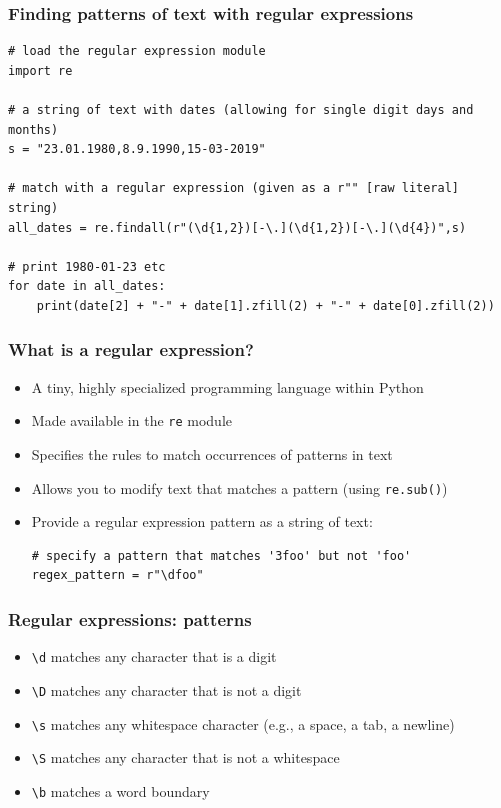 \documentclass[xcolor=table]{beamer}
\begin{document}
\begin{frame}[fragile]
\frametitle{Finding patterns of text with regular expressions}
\begin{lstlisting}[style=python]
# load the regular expression module
import re

# a string of text with dates (allowing for single digit days and months)
s = "23.01.1980,8.9.1990,15-03-2019"

# match with a regular expression (given as a r"" [raw literal] string)
all_dates = re.findall(r"(\d{1,2})[-\.](\d{1,2})[-\.](\d{4})",s)

# print 1980-01-23 etc
for date in all_dates:
    print(date[2] + "-" + date[1].zfill(2) + "-" + date[0].zfill(2))
\end{lstlisting}
\end{frame}
\begin{frame}[fragile]
\frametitle{What is a regular expression?}
    \begin{itemize}
        \item<1-> A tiny, highly specialized programming language within Python
        \item<2-> Made available in the \texttt{re} module
        \item<3-> Specifies the rules to match occurrences of patterns in text
        \item<4-> Allows you to modify text that matches a pattern (using \texttt{re.sub()})
        \item<5-> Provide a regular expression pattern as a string of text:
\begin{lstlisting}[style=python]
# specify a pattern that matches '3foo' but not 'foo'
regex_pattern = r"\dfoo"
\end{lstlisting}
    \end{itemize}
\end{frame}

\begin{frame}[fragile]
\frametitle{Regular expressions: patterns}
    \begin{itemize}
        \item<1->\texttt{\textbackslash d} matches any character that is a digit
        \item<2->\texttt{\textbackslash D} matches any character that is not a digit
        \item<3->\texttt{\textbackslash s} matches any whitespace character (e.g., a space, a tab, a newline)
        \item<4->\texttt{\textbackslash S} matches any character that is not a whitespace
        \item<5->\texttt{\textbackslash b} matches a word boundary
    \end{itemize}
\end{frame}
\end{document}
